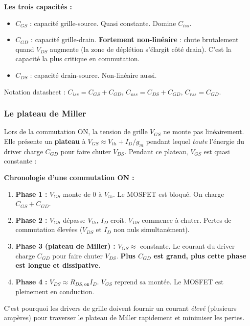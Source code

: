 \documentclass[12pt,a4paper,twoside]{book}
\begin{document}
\begin{formule}
\textbf{Les trois capacités :}
\begin{itemize}[nosep]
\item $C_{GS}$ : capacité grille-source. Quasi constante. Domine $C_{iss}$.
\item $C_{GD}$ : capacité grille-drain. \textbf{Fortement non-linéaire} : chute brutalement quand $V_{DS}$ augmente (la zone de déplétion s'élargit côté drain). C'est la capacité la plus critique en commutation.
\item $C_{DS}$ : capacité drain-source. Non-linéaire aussi.
\end{itemize}
Notation datasheet : $C_{iss} = C_{GS}+C_{GD}$, $C_{oss} = C_{DS}+C_{GD}$, $C_{rss} = C_{GD}$.
\end{formule}

\subsubsection*{Le plateau de Miller}

Lors de la commutation ON, la tension de grille $V_{GS}$ ne monte pas linéairement. Elle présente un \textbf{plateau} à $V_{GS} \approx V_{th} + I_D/g_m$ pendant lequel \textit{toute} l'énergie du driver charge $C_{GD}$ pour faire chuter $V_{DS}$. Pendant ce plateau, $V_{GS}$ est quasi constante :

\begin{intuition}
\textbf{Chronologie d'une commutation ON :}
\begin{enumerate}[nosep]
\item \textbf{Phase 1 :} $V_{GS}$ monte de $0$ à $V_{th}$. Le MOSFET est bloqué. On charge $C_{GS}+C_{GD}$.
\item \textbf{Phase 2 :} $V_{GS}$ dépasse $V_{th}$, $I_D$ croît. $V_{DS}$ commence à chuter. Pertes de commutation élevées ($V_{DS}$ et $I_D$ non nuls simultanément).
\item \textbf{Phase 3 (plateau de Miller) :} $V_{GS} \approx$ constante. Le courant du driver charge $C_{GD}$ pour faire chuter $V_{DS}$. \textbf{Plus $C_{GD}$ est grand, plus cette phase est longue et dissipative.}
\item \textbf{Phase 4 :} $V_{DS} \approx R_{DS,\text{on}} I_D$. $V_{GS}$ reprend sa montée. Le MOSFET est pleinement en conduction.
\end{enumerate}
C'est pourquoi les drivers de grille doivent fournir un courant \textit{élevé} (plusieurs ampères) pour traverser le plateau de Miller rapidement et minimiser les pertes.
\end{intuition}
\end{document}

